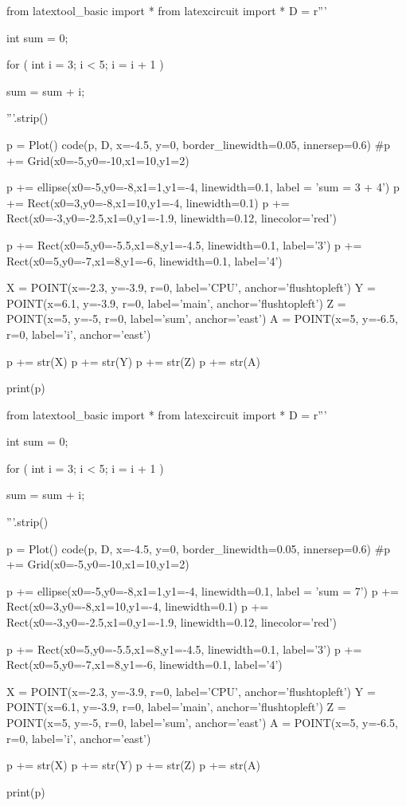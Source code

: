 \begin{python}
from latextool_basic import *
from latexcircuit import *
D = r'''



int sum = 0;

    for ( int i = 3;     i < 5;     i = i + 1 )


        sum = sum + i;



'''.strip()

p = Plot()
code(p, D, x=-4.5, y=0, border_linewidth=0.05, innersep=0.6)
#p += Grid(x0=-5,y0=-10,x1=10,y1=2)

p += ellipse(x0=-5,y0=-8,x1=1,y1=-4, linewidth=0.1, label = 'sum = 3 + 4')
p += Rect(x0=3,y0=-8,x1=10,y1=-4, linewidth=0.1)
p += Rect(x0=-3,y0=-2.5,x1=0,y1=-1.9, linewidth=0.12, linecolor='red')

p += Rect(x0=5,y0=-5.5,x1=8,y1=-4.5, linewidth=0.1, label='3')
p += Rect(x0=5,y0=-7,x1=8,y1=-6, linewidth=0.1, label='4')

X = POINT(x=-2.3, y=-3.9, r=0, label='CPU', anchor='flushtopleft')
Y = POINT(x=6.1, y=-3.9, r=0, label='main', anchor='flushtopleft')
Z = POINT(x=5, y=-5, r=0, label='sum', anchor='east')
A = POINT(x=5, y=-6.5, r=0, label='i', anchor='east')

p += str(X)
p += str(Y)
p += str(Z)
p += str(A)

print(p)
\end{python}

\begin{python}
from latextool_basic import *
from latexcircuit import *
D = r'''



int sum = 0;

    for ( int i = 3;     i < 5;     i = i + 1 )


        sum = sum + i;



'''.strip()

p = Plot()
code(p, D, x=-4.5, y=0, border_linewidth=0.05, innersep=0.6)
#p += Grid(x0=-5,y0=-10,x1=10,y1=2)

p += ellipse(x0=-5,y0=-8,x1=1,y1=-4, linewidth=0.1, label = 'sum = 7')
p += Rect(x0=3,y0=-8,x1=10,y1=-4, linewidth=0.1)
p += Rect(x0=-3,y0=-2.5,x1=0,y1=-1.9, linewidth=0.12, linecolor='red')

p += Rect(x0=5,y0=-5.5,x1=8,y1=-4.5, linewidth=0.1, label='3')
p += Rect(x0=5,y0=-7,x1=8,y1=-6, linewidth=0.1, label='4')

X = POINT(x=-2.3, y=-3.9, r=0, label='CPU', anchor='flushtopleft')
Y = POINT(x=6.1, y=-3.9, r=0, label='main', anchor='flushtopleft')
Z = POINT(x=5, y=-5, r=0, label='sum', anchor='east')
A = POINT(x=5, y=-6.5, r=0, label='i', anchor='east')

p += str(X)
p += str(Y)
p += str(Z)
p += str(A)

print(p)
\end{python}


